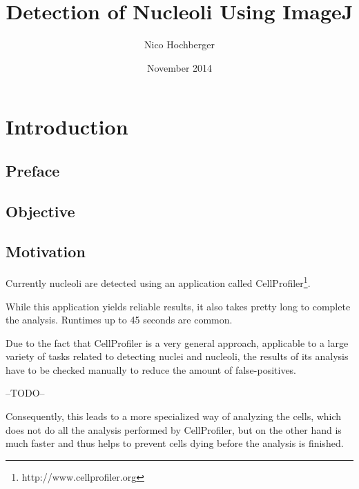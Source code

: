 \documentclass[a4paper, 11pt]{article}
\begin{document}


\title{Detection of Nucleoli Using ImageJ}
\author{Nico Hochberger}
\date{November 2014}
\maketitle

\newpage
\tableofcontents

\newpage
\section{Introduction}

\subsection{Preface}
 
\subsection{Objective}

\subsection{Motivation}
Currently nucleoli are detected using an application called
CellProfiler\footnote{http://www.cellprofiler.org}.

While this application yields reliable results, it also takes pretty long to complete
the analysis. Runtimes up to 45 seconds are common.

Due to the fact that CellProfiler is a very general approach, applicable to a
large variety of tasks related to detecting nuclei and nucleoli, the results of
its analysis have to be checked manually to reduce the amount of
false-positives.

--TODO--

Consequently, this leads to a more specialized way of analyzing the cells, which
does not do all the analysis performed by CellProfiler, but on the other hand is
much faster and thus helps to prevent cells dying before the analysis is
finished.
\end{document}
